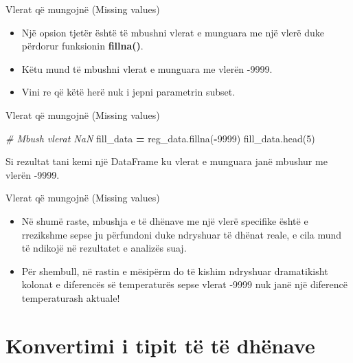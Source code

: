 \documentclass[
  ignorenonframetext,
]{beamer}
\newenvironment{Shaded}{\begin{snugshade}}{\end{snugshade}}
\newcommand{\CommentTok}[1]{\textcolor[rgb]{0.56,0.35,0.01}{\textit{#1}}}
\newcommand{\DecValTok}[1]{\textcolor[rgb]{0.00,0.00,0.81}{#1}}
\newcommand{\NormalTok}[1]{#1}
\newcommand{\OperatorTok}[1]{\textcolor[rgb]{0.81,0.36,0.00}{\textbf{#1}}}
\begin{document}
\begin{frame}{Vlerat që mungojnë (Missing values)}
\protect\hypertarget{vlerat-quxeb-mungojnuxeb-missing-values-6}{}
\begin{itemize}
\item
  Një opsion tjetër është të mbushni vlerat e munguara me një vlerë duke
  përdorur funksionin \textbf{fillna()}.
\item
  Këtu mund të mbushni vlerat e munguara me vlerën -9999.
\item
  Vini re që këtë herë nuk i jepni parametrin subset.
\end{itemize}
\end{frame}

\begin{frame}[fragile]{Vlerat që mungojnë (Missing values)}
\protect\hypertarget{vlerat-quxeb-mungojnuxeb-missing-values-7}{}
\begin{Shaded}
\begin{Highlighting}[]
\CommentTok{\# Mbush vlerat NaN}
\NormalTok{fill\_data }\OperatorTok{=}\NormalTok{ reg\_data.fillna(}\OperatorTok{{-}}\DecValTok{9999}\NormalTok{)}
\NormalTok{fill\_data.head(}\DecValTok{5}\NormalTok{)}
\end{Highlighting}
\end{Shaded}

Si rezultat tani kemi një DataFrame ku vlerat e munguara janë mbushur me
vlerën -9999.
\end{frame}

\begin{frame}{Vlerat që mungojnë (Missing values)}
\protect\hypertarget{vlerat-quxeb-mungojnuxeb-missing-values-8}{}
\begin{itemize}
\item
  Në shumë raste, mbushja e të dhënave me një vlerë specifike është e
  rrezikshme sepse ju përfundoni duke ndryshuar të dhënat reale, e cila
  mund të ndikojë në rezultatet e analizës suaj.
\item
  Për shembull, në rastin e mësipërm do të kishim ndryshuar dramatikisht
  kolonat e diferencës së temperaturës sepse vlerat -9999 nuk janë një
  diferencë temperaturash aktuale!
\end{itemize}
\end{frame}

\hypertarget{konvertimi-i-tipit-tuxeb-tuxeb-dhuxebnave}{%
\section{Konvertimi i tipit të të
dhënave}\label{konvertimi-i-tipit-tuxeb-tuxeb-dhuxebnave}}
\end{document}
